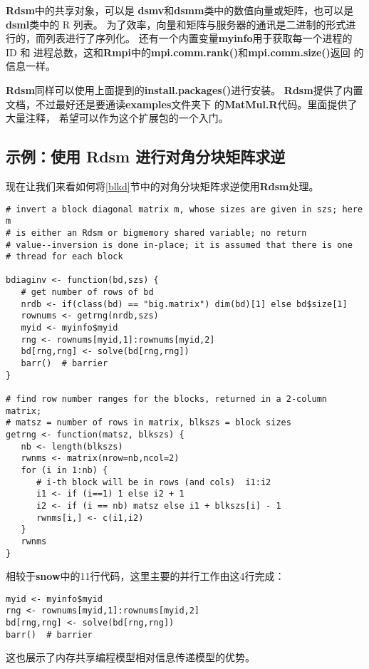 {\bf Rdsm}中的共享对象，可以是
{\bf dsmv}和{\bf dsmm}类中的数值向量或矩阵，也可以是{\bf dsml}类中的 R 列表。
为了效率，向量和矩阵与服务器的通讯是二进制的形式进行的，而列表进行了序列化。
还有一个内置变量{\bf myinfo}用于获取每一个进程的 ID 和
进程总数，这和{\bf Rmpi}中的{\bf mpi.comm.rank()}和{\bf mpi.comm.size()}返回
的信息一样。

{\bf Rdsm}同样可以使用上面提到的{\bf install.packages()}进行安装。
{\bf Rdsm}提供了内置文档，不过最好还是要通读{\bf examples}文件夹下
的{\bf MatMul.R}代码。里面提供了大量注释，
希望可以作为这个扩展包的一个入门。

\subsection{示例：使用 Rdsm 进行对角分块矩阵求逆}

现在让我们来看如何将\ref{blkd}节中的对角分块矩阵求逆使用{\bf Rdsm}处理。

\begin{lstlisting}
# invert a block diagonal matrix m, whose sizes are given in szs; here m
# is either an Rdsm or bigmemory shared variable; no return
# value--inversion is done in-place; it is assumed that there is one
# thread for each block

bdiaginv <- function(bd,szs) {
   # get number of rows of bd
   nrdb <- if(class(bd) == "big.matrix") dim(bd)[1] else bd$size[1]
   rownums <- getrng(nrdb,szs)
   myid <- myinfo$myid
   rng <- rownums[myid,1]:rownums[myid,2]
   bd[rng,rng] <- solve(bd[rng,rng])
   barr()  # barrier
}

# find row number ranges for the blocks, returned in a 2-column matrix;
# matsz = number of rows in matrix, blkszs = block sizes
getrng <- function(matsz, blkszs) {
   nb <- length(blkszs)
   rwnms <- matrix(nrow=nb,ncol=2)
   for (i in 1:nb) {
      # i-th block will be in rows (and cols)  i1:i2
      i1 <- if (i==1) 1 else i2 + 1
      i2 <- if (i == nb) matsz else i1 + blkszs[i] - 1
      rwnms[i,] <- c(i1,i2)
   }
   rwnms
}
\end{lstlisting}

相较于{\bf snow}中的11行代码，这里主要的并行工作由这4行完成：

\begin{lstlisting}
myid <- myinfo$myid
rng <- rownums[myid,1]:rownums[myid,2]
bd[rng,rng] <- solve(bd[rng,rng])
barr()  # barrier
\end{lstlisting}


这也展示了内存共享编程模型相对信息传递模型的优势。

